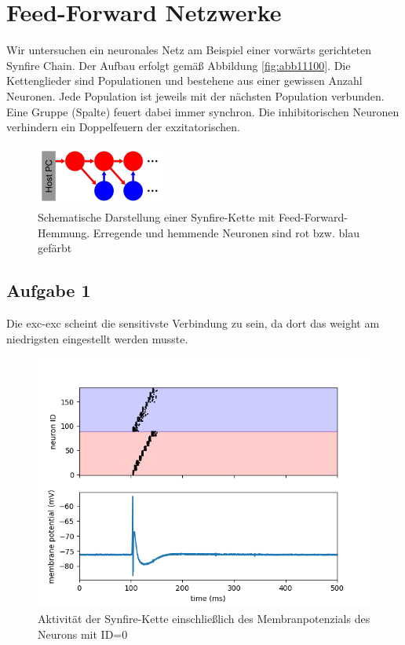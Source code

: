 \documentclass[10pt,a4paper]{scrartcl}
\begin{document}
\newpage


\section{Feed-Forward Netzwerke}
Wir untersuchen ein neuronales Netz am Beispiel einer vorwärts gerichteten Synfire Chain. Der Aufbau erfolgt gemäß Abbildung \ref{fig:abb11100}. Die Kettenglieder sind Populationen und bestehene aus einer gewissen Anzahl Neuronen. Jede Population ist jeweils mit der nächsten Population verbunden. Eine Gruppe (Spalte) feuert dabei immer synchron. Die inhibitorischen Neuronen verhindern ein Doppelfeuern der exzitatorischen. 

\begin{figure} [ht]
\begin{center}
\label{fig:abb4}
\caption{Schematische Darstellung einer Synfire-Kette mit Feed-Forward-Hemmung. Erregende und hemmende Neuronen sind rot bzw. blau gefärbt}
\includegraphics[scale=0.8]{pictures/synfire_chain.png}
\end{center}
\end{figure}

\subsection{Aufgabe 1}

Die exc-exc scheint die sensitivste Verbindung zu sein, da dort das weight am niedrigsten eingestellt werden musste. 



\begin{figure} [ht]
\begin{center}
\label{fig:abb4}
\caption{Aktivität der Synfire-Kette einschließlich des Membranpotenzials des Neurons mit ID=0}
\includegraphics[scale=0.35]{pictures/task1_synfire_chain.png}
\end{center}
\end{figure}
\end{document}

